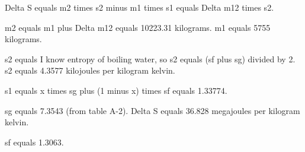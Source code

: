 Delta S equals m2 times s2 minus m1 times s1 equals Delta m12 times s2.  

m2 equals m1 plus Delta m12 equals 10223.31 kilograms.  
m1 equals 5755 kilograms.  

s2 equals I know entropy of boiling water, so s2 equals (sf plus sg) divided by 2.  
s2 equals 4.3577 kilojoules per kilogram kelvin.  

s1 equals x times sg plus (1 minus x) times sf equals 1.33774.  

sg equals 7.3543 (from table A-2).  
Delta S equals 36.828 megajoules per kilogram kelvin.  

sf equals 1.3063.